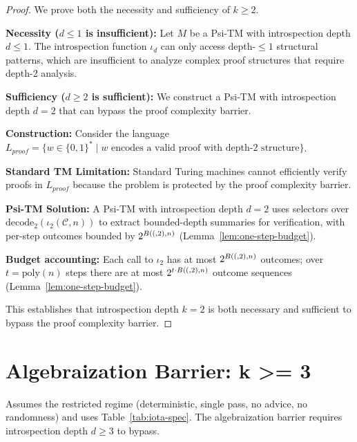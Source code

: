 \begin{proof}
We prove both the necessity and sufficiency of $k \geq 2$.

\textbf{Necessity ($d \le 1$ is insufficient):}
Let $M$ be a Psi-TM with introspection depth $d \leq 1$. The introspection function $\iota_d$ can only access depth-$\leq 1$ structural patterns, which are insufficient to analyze complex proof structures that require depth-2 analysis.

\textbf{Sufficiency ($d \ge 2$ is sufficient):}
We construct a Psi-TM with introspection depth $d = 2$ that can bypass the proof complexity barrier.

\textbf{Construction:}
Consider the language $L_{proof} = \{w \in \{0,1\}^* \mid w \text{ encodes a valid proof with depth-2 structure}\}$.

\textbf{Standard TM Limitation:}
Standard Turing machines cannot efficiently verify proofs in $L_{proof}$ because the problem is protected by the proof complexity barrier.

\textbf{Psi-TM Solution:}
A Psi-TM with introspection depth $d = 2$ uses selectors over $\mathrm{decode}_2(\iota_2(\mathcal{C},n))$ to extract bounded-depth summaries for verification, with per-step outcomes bounded by $2^{B((,2),n)}$ (Lemma~\ref{lem:one-step-budget}).

\textbf{Budget accounting:}
Each call to $\iota_2$ has at most $2^{B((,2),n)}$ outcomes; over $t=\mathrm{poly}(n)$ steps there are at most $2^{t\cdot B((,2),n)}$ outcome sequences (Lemma~\ref{lem:one-step-budget}).

This establishes that introspection depth $k = 2$ is both necessary and sufficient to bypass the proof complexity barrier.
\end{proof}

\section{Algebraization Barrier: k >= 3}

\begin{theorem}
Assumes the restricted regime (deterministic, single pass, no advice, no randomness) and uses Table~\ref{tab:iota-spec}.
The algebraization barrier requires introspection depth $d \geq 3$ to bypass.
\end{theorem}

